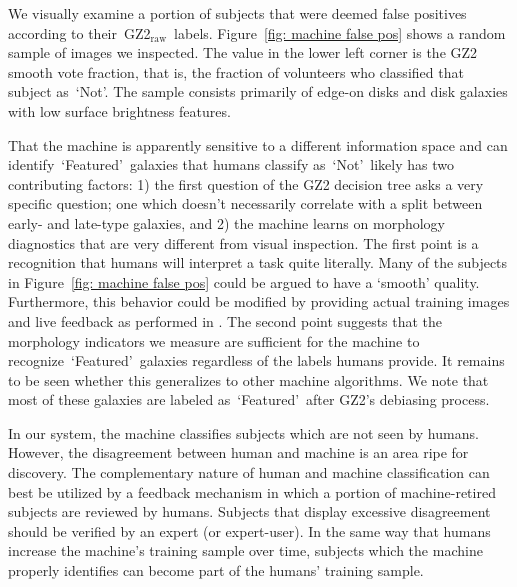 \documentclass[twocolumn]{aastex6}
\newcommand{\feat}{`Featured'}
\newcommand{\notfeat}{`Not'}
\newcommand{\raw}{GZ2$_{\text{raw}}$}
\begin{document}
We visually examine a portion of subjects that
were deemed false positives according to their~\raw~labels. 
Figure~\ref{fig: machine false pos} shows a random sample of images we inspected. 
The value in the lower left corner is the GZ2 smooth vote fraction, that is, the
fraction of volunteers who classified that subject as~\notfeat. The sample
consists primarily of edge-on disks and disk galaxies with low surface brightness
features. 

That the machine is apparently sensitive to a different information space and 
can identify~\feat~galaxies that humans classify as~\notfeat~likely has two 
 contributing factors: 
1) the first question of the GZ2 decision tree asks a very specific question; one which doesn't necessarily correlate with a split between early- and late-type galaxies, and 
 2) the machine learns on morphology diagnostics that are very different from visual inspection. 
The first point is a recognition that humans will interpret a task quite literally. 
Many of the subjects in Figure~\ref{fig: machine false pos} could be argued to 
have a `smooth' quality. Furthermore, this behavior could be modified by providing
actual training images and live feedback as performed in \cite{Marshall2016}. 
The second point suggests that the morphology indicators we measure are 
sufficient for the machine to recognize~\feat~galaxies regardless of the labels humans provide. 
It remains to be seen whether this generalizes to other machine algorithms.
We note that most of these galaxies are labeled as~\feat~after GZ2's debiasing process. 

In our system, the machine classifies subjects which are not seen by humans. 
However, the disagreement between human and machine is an area ripe for 
discovery. The complementary nature of human and machine classification can 
best be utilized by a feedback mechanism in which a portion of machine-retired
subjects are reviewed by humans. Subjects that display excessive disagreement
should be verified by an expert (or expert-user).  In the same way that 
humans increase the machine's training sample over time, subjects which the
machine properly identifies can become part of the humans' training sample. 
 
\end{document}

